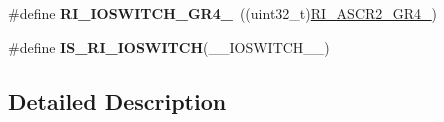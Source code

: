 \begin{DoxyCompactItemize}
\item 
\hypertarget{group___r_i___i_o_switch_ga745a4c7a8642a9925420ce16b68f0e10}{\#define {\bfseries R\-I\-\_\-\-I\-O\-S\-W\-I\-T\-C\-H\-\_\-\-G\-R4\-\_}~((uint32\-\_\-t)\hyperlink{group___peripheral___registers___bits___definition_ga75318d892c468098e8d4ca30ff59c21b}{R\-I\-\_\-\-A\-S\-C\-R2\-\_\-\-G\-R4\-\_})}\label{group___r_i___i_o_switch_ga745a4c7a8642a9925420ce16b68f0e10}

\item 
\#define {\bfseries I\-S\-\_\-\-R\-I\-\_\-\-I\-O\-S\-W\-I\-T\-C\-H}(\-\_\-\-\_\-\-I\-O\-S\-W\-I\-T\-C\-H\-\_\-\-\_\-)
\end{DoxyCompactItemize}


\subsection{Detailed Description}


